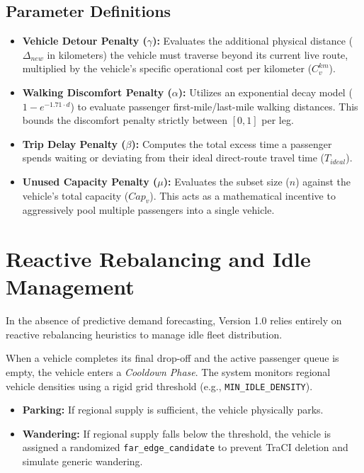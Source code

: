 \documentclass[12pt,a4paper]{article}
\begin{document}
\subsection{Parameter Definitions}
\begin{itemize}
    \item \textbf{Vehicle Detour Penalty ($\gamma$):} Evaluates the additional physical distance ($\Delta_{new}$ in kilometers) the vehicle must traverse beyond its current live route, multiplied by the vehicle's specific operational cost per kilometer ($C^{km}_v$).
    \item \textbf{Walking Discomfort Penalty ($\alpha$):} Utilizes an exponential decay model ($1 - e^{-1.71 \cdot d}$) to evaluate passenger first-mile/last-mile walking distances. This bounds the discomfort penalty strictly between $[0, 1]$ per leg.
    \item \textbf{Trip Delay Penalty ($\beta$):} Computes the total excess time a passenger spends waiting or deviating from their ideal direct-route travel time ($T_{ideal}$).
    \item \textbf{Unused Capacity Penalty ($\mu$):} Evaluates the subset size ($n$) against the vehicle's total capacity ($Cap_v$). This acts as a mathematical incentive to aggressively pool multiple passengers into a single vehicle.
\end{itemize}

\section{Reactive Rebalancing and Idle Management}
In the absence of predictive demand forecasting, Version 1.0 relies entirely on reactive rebalancing heuristics to manage idle fleet distribution.

When a vehicle completes its final drop-off and the active passenger queue is empty, the vehicle enters a \textit{Cooldown Phase}. The system monitors regional vehicle densities using a rigid grid threshold (e.g., \texttt{MIN\_IDLE\_DENSITY}). 
\begin{itemize}
    \item \textbf{Parking:} If regional supply is sufficient, the vehicle physically parks.
    \item \textbf{Wandering:} If regional supply falls below the threshold, the vehicle is assigned a randomized \texttt{far\_edge\_candidate} to prevent TraCI deletion and simulate generic wandering.
\end{itemize}
\end{document}
